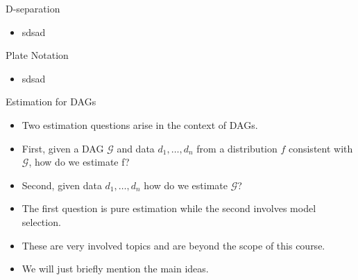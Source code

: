 \documentclass[handout]{beamer}
\begin{document}
\begin{frame}{D-separation}
\scriptsize{
\begin{itemize}
\item sdsad

 
\end{itemize}



} 

\end{frame}


\begin{frame}{Plate Notation}
\scriptsize{
\begin{itemize}
\item sdsad

 
\end{itemize}



} 

\end{frame}



\begin{frame}{Estimation for DAGs}
\scriptsize{
\begin{itemize}
\item Two estimation questions arise in the context of DAGs. 
\item First, given a DAG $\mathcal{G}$ and data $d_1,\dots,d_n$ from a distribution $f$ consistent with $\mathcal{G}$, how do we estimate f?

\item Second, given data $d_1,\dots,d_n$ how do we estimate $\mathcal{G}$?

\item The first question is pure estimation while the second involves model selection.

\item These are very involved topics and are beyond the scope of this course.

\item We will just briefly mention the main ideas.

 
\end{itemize}



} 

\end{frame}
\end{document}
